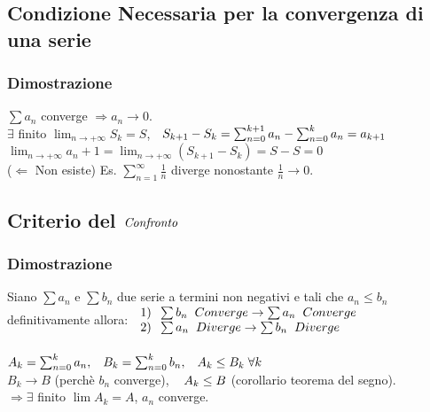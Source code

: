 \documentclass[11pt, a4paper]{article}
\begin{document}
\subsection{Condizione Necessaria per la convergenza di una serie}
\subsubsection*{Dimostrazione}
$\sum{a_n}$ converge $\Longrightarrow a_n\rightarrow 0$.\\
$\exists$ finito $\lim_{n\to +\infty}{S_k}=S$, $\hspace{0.2cm} S_{k+1}-S_k=\sum_{n=0}^{k+1}{a_n}-\sum_{n=0}^{k}{a_n}=a_{k+1}$\\
$\lim_{n \to +\infty}{a_n+1}=\lim_{n \to +\infty}{(S_{k+1}-S_k)}=S-S=0$\\
($\Longleftarrow$ Non esiste) Es. $\sum_{n=1}^{\infty}{\frac{1}{n}}$ diverge nonostante $\frac{1}{n} \rightarrow 0$.

\subsection{Criterio del $\emph{Confronto}$}
\subsubsection*{Dimostrazione}
Siano $\sum{a_n}$ e $\sum{b_n}$ due serie a termini non negativi e tali che $a_n \leq b_n$ definitivamente allora: $\left.\begin{array}{l} 1)\hspace{0.2cm} \sum{b_n} \hspace{0.2cm} Converge \rightarrow \sum{a_n} \hspace{0.2cm} Converge\\
2) \hspace{0.2cm} \sum{a_n} \hspace{0.2cm} Diverge \rightarrow \sum{b_n} \hspace{0.2cm} Diverge\\
\end{array}\right.$\\\\
$A_k=\sum_{n=0}^{k}{a_n}, \hspace{0.3cm} B_k=\sum_{n=0}^{k}{b_n}, \hspace{0.3cm} A_k \leq B_k \hspace{0.1cm} \forall k$\\
$B_k \rightarrow B$ (perchè $b_n$ converge), $\hspace{0.3cm} A_k \leq B$ (corollario teorema del segno).\\
$\Longrightarrow \exists$ finito $\lim{A_k}=A$,  $a_n$ converge.
\end{document}
